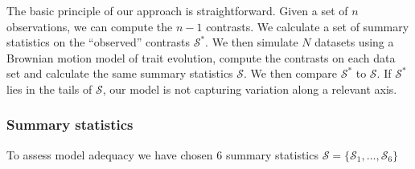 \documentclass[12pt]{article}
\begin{document}
The basic principle of our approach is straightforward. Given a set of $n$ observations, we can compute the $n-1$ contrasts. We calculate a set of summary statistics on the ``observed'' contrasts $\mathcal{S}^*$. We then simulate $N$ datasets using a Brownian motion model of trait evolution, compute the contrasts on each data set and calculate the same summary statistics $\mathcal{S}$. We then compare $\mathcal{S}^*$ to $\mathcal{S}$. If $\mathcal{S}^*$ lies in the tails of $\mathcal{S}$, our model is not capturing variation along a relevant axis. 

\subsubsection{Summary statistics}

To assess model adequacy we have chosen 6 summary statistics $\mathcal{S} = \lbrace \mathcal{S}_1, \ldots, \mathcal{S}_6 \rbrace$ 
\end{document}
